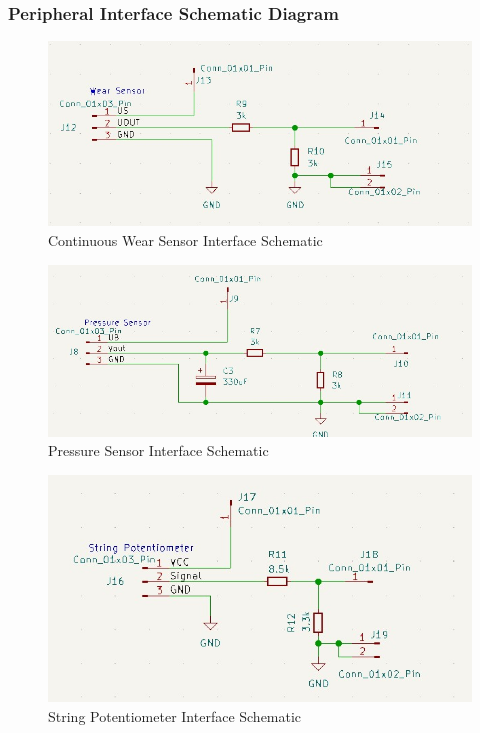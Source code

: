 \documentclass[8pt,compress,aspectratio=169]{beamer}
\begin{document}
\begin{frame}
  \frametitle{Peripheral Interface Schematic Diagram }
  \begin{minipage}{0.495\textwidth}
    \begin{figure}
      \includegraphics[width=\textwidth]{assets/electronic/wear_schem.jpg}
      \caption{Continuous Wear Sensor Interface Schematic}
    \end{figure}
    \begin{figure}
      \includegraphics[width=\textwidth]{assets/electronic/pressure_schem.jpg}
      \caption{Pressure Sensor Interface Schematic}
    \end{figure}
  \end{minipage}
  \hfill
  \begin{minipage}{0.49\textwidth}
    \begin{figure}
      \includegraphics[width=\textwidth]{assets/electronic/string_pcb.jpg}
      \caption{String Potentiometer Interface Schematic}
    \end{figure}


\end{minipage}
\end{frame}
\end{document}
